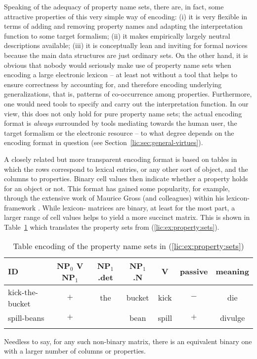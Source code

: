 \documentclass[output=paper]{langsci/langscibook}
\begin{document}
Speaking of the adequacy of property name sets, there are, in fact, some attractive properties of this very simple way of encoding: (i) it is very flexible in terms of adding and removing property names and adapting the interpretation function to some target formalism; (ii) it makes empirically largely neutral descriptions available; (iii) it is conceptually lean and inviting for formal novices because the main data structures are just ordinary sets. On the other hand, it is obvious that nobody would seriously make use of property name sets when encoding a large electronic lexicon -- at least not without a tool that helps to ensure correctness by accounting for, and therefore encoding underlying generalizations, that is, patterns of co-occurrence among properties. Furthermore, one would need tools to specify and carry out the interpretation function. In our view, this does not only hold for pure property name sets; the actual encoding format is \textit{always} surrounded by tools mediating towards the human user, the target formalism or the electronic resource -- to what degree depends on the encoding format in question (see Section~\ref{lic:sec:general-virtues}).

A closely related but more transparent encoding format is based on tables in which the rows correspond to lexical entries, or any other sort of object, and the columns to properties. Binary cell values then indicate whether a property holds for an object or not. This format has gained some popularity, for example, through the extensive work of Maurice Gross (and colleagues) within his lexicon- framework \citep{gross:94}. While lexicon- matrices are binary, at least for the most part, a larger range of cell values helps to yield a more succinct matrix. This is shown in Table~\ref{lic:tab:table-encoding} which translates the property sets from (\ref{lic:ex:property:sets}). 
\begin{table}[tp]
  \small
  \begin{tabular}{lcccccc}
    \lsptoprule
    ID              & NP$_{\text{0}}$ V NP$_{\text{1}}$ & NP$_{\text{1}}$.det & NP$_{\text{1}}$.N & V     & passive & meaning \\  
    \midrule
    kick-the-bucket & $+$                                 & the                 & bucket            & kick  & $-$       & die     \\
    spill-beans     & $+$                                 &                     & bean              & spill & $+$       & divulge \tabularnewline %
    \lspbottomrule
  \end{tabular}
  \caption{Table encoding of the property name sets in (\ref{lic:ex:property:sets})}
  \label{lic:tab:table-encoding}
\end{table}
Needless to say, for any such non-binary matrix, there is an equivalent binary one with a larger number of columns or properties.
\end{document}
